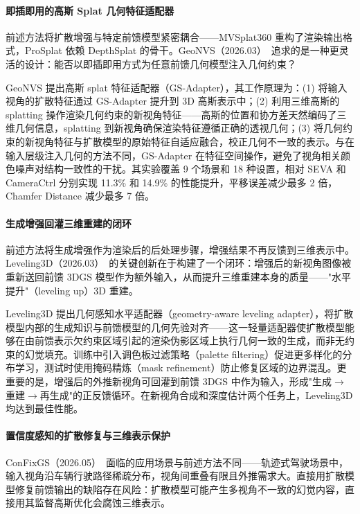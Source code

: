 \paragraph{即插即用的高斯 Splat 几何特征适配器}

前述方法将扩散增强与特定前馈模型紧密耦合——MVSplat360 重构了渲染输出格式，ProSplat 依赖 DepthSplat 的骨干。GeoNVS（2026.03）~\cite{2603_14965}追求的是一种更灵活的设计：能否以即插即用方式为任意前馈几何模型注入几何约束？

GeoNVS 提出高斯 splat 特征适配器（GS-Adapter），其工作原理为：(1) 将输入视角的扩散特征通过 GS-Adapter 提升到 3D 高斯表示中；(2) 利用三维高斯的 splatting 操作渲染几何约束的新视角特征——高斯的位置和协方差天然编码了三维几何信息，splatting 到新视角确保渲染特征遵循正确的透视几何；(3) 将几何约束的新视角特征与扩散模型的原始特征自适应融合，校正几何不一致的表示。与在输入层级注入几何的方法不同，GS-Adapter 在特征空间操作，避免了视角相关颜色噪声对结构一致性的干扰。其实验覆盖 9 个场景和 18 种设置，相对 SEVA 和 CameraCtrl 分别实现 11.3\% 和 14.9\% 的性能提升，平移误差减少最多 2 倍，Chamfer Distance 减少最多 7 倍。

\paragraph{生成增强回灌三维重建的闭环}

前述方法将生成增强作为渲染后的后处理步骤，增强结果不再反馈到三维表示中。Leveling3D（2026.03）~\cite{2603_16211}的关键创新在于构建了一个闭环：增强后的新视角图像被重新送回前馈 3DGS 模型作为额外输入，从而提升三维重建本身的质量——"水平提升"（leveling up）3D 重建。

Leveling3D 提出几何感知水平适配器（geometry-aware leveling adapter），将扩散模型内部的生成知识与前馈模型的几何先验对齐——这一轻量适配器使扩散模型能够在由前馈表示欠约束区域引起的渲染伪影区域上执行几何一致的生成，而非无约束的幻觉填充。训练中引入调色板过滤策略（palette filtering）促进更多样化的分布学习，测试时使用掩码精炼（mask refinement）防止修复区域的边界混乱。更重要的是，增强后的外推新视角可回灌到前馈 3DGS 中作为输入，形成"生成$\to$重建$\to$再生成"的正反馈循环。在新视角合成和深度估计两个任务上，Leveling3D 均达到最佳性能。

\paragraph{置信度感知的扩散修复与三维表示保护}

ConFixGS（2026.05）~\cite{2605_09688}面临的应用场景与前述方法不同——轨迹式驾驶场景中，输入视角沿车辆行驶路径稀疏分布，视角间重叠有限且外推需求大。直接用扩散模型修复前馈输出的缺陷存在风险：扩散模型可能产生多视角不一致的幻觉内容，直接用其监督高斯优化会腐蚀三维表示。

